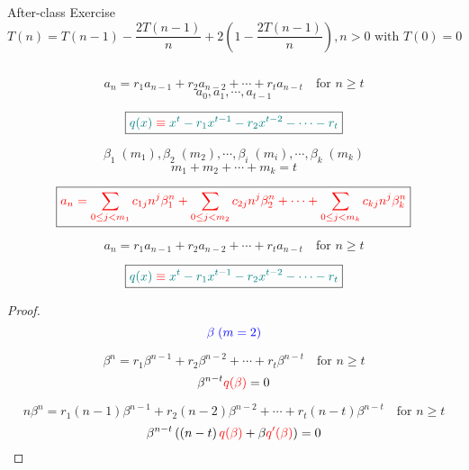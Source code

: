 \begin{frame}{}
  \begin{exampleblock}{After-class Exercise}
    \[
      T(n) = T(n-1) - \frac{2T(n-1)}{n} + 2\left(1 - \frac{2T(n-1)}{n}\right), n > 0 \text{ with } T(0) = 0
    \]
  \end{exampleblock}

  \begin{columns}
    \pause
    \pause
  \end{columns}
\end{frame}

\begin{frame}{}
  \begin{theorem}
    \[
      a_n = r_1 a_{n-1} + r_2 a_{n-2} + \cdots + r_t a_{n-t} \quad \text{for } n \ge t
    \]
    \[
      a_0, a_1, \cdots, a_{t-1}
    \]

    \pause
    \[
      \boxed{\textcolor{teal}{q(x) \;\textcolor{red}{\equiv}\; x^t - r_1 x^{t-1} - r_2 x^{t-2} - \cdots - r_t}}
    \]

    \pause
    \[
      \beta_1\; (m_1), \beta_2\; (m_2), \cdots, \beta_i\; (m_i), \cdots, \beta_{k}\; (m_k)
    \]
    \[
      m_1 + m_2 + \cdots + m_k = t
    \]

    \pause
    \[
      \boxed{\textcolor{red}{a_n = \sum_{0 \le j < m_1} c_{1j} n^j \beta_{1}^{n} + \sum_{0 \le j < m_2} c_{2j} n^j \beta_{2}^{n} + \cdots 
	+ \sum_{0 \le j < m_k} c_{kj} n^j \beta_{k}^{n}}}
    \]
  \end{theorem}
\end{frame}

\begin{frame}{}
  \[
    a_n = r_1 a_{n-1} + r_2 a_{n-2} + \cdots + r_t a_{n-t} \quad \text{for } n \ge t
  \]

  \[
    \boxed{\textcolor{teal}{q(x) \;\textcolor{red}{\equiv}\; x^t - r_1 x^{t-1} - r_2 x^{t-2} - \cdots - r_t}}
  \]

  \pause
  \begin{proof}
    \[
      \textcolor{blue}{\beta \; (m = 2)}
    \]

    \pause
    \[
      \beta^n = r_1 \beta^{n-1} + r_2 \beta^{n-2} + \cdots + r_t \beta^{n-t} \quad \text{for } n \ge t
    \]
    \pause
    \vspace{-0.50cm}
    \[
      \beta^{n-t} \textcolor{red}{q(\beta)} = 0
    \]

    \pause
    \vspace{-0.50cm}
    \[
      n\beta^{n} = r_1 (n-1) \beta^{n-1} + r_2 (n-2) \beta^{n-2} + \cdots + r_t (n-t) \beta^{n-t} \quad \text{for } n \ge t
    \]
    \pause
    \vspace{-0.50cm}
    \[
      \beta^{n-t} \left(\left(n-t\right)\textcolor{red}{q(\beta)} + \beta \textcolor{red}{q'(\beta)}\right) = 0
    \]
  \end{proof}
\end{frame}


